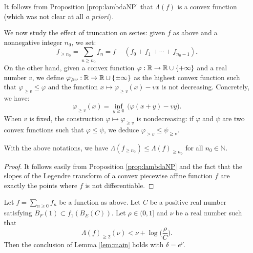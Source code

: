 \documentclass{lms}
\begin{document}
\begin{rem}
It follows from Proposition \ref{prop:lambdaNP} that $\Lambda(f)$ is a
convex function (which was not clear at all \emph{a priori}).
\end{rem}

We now study the effect of truncation on series: given $f$ as above
and a nonnegative integer $n_0$, we set:
$$f_{\geq n_0} = \sum_{n \geq n_0} f_n = f - (f_0 + f_1 + \cdots +
f_{n_0 - 1}).$$
On the other hand, given a convex function $\varphi : \mathbb R \to \mathbb R \cup
\{+\infty\}$ and a real number $v$, we define $\varphi_{\geqslant v} : \mathbb R \to 
\mathbb R \cup \{\pm \infty\}$ as the highest convex function such that 
$\varphi_{\geq v} \leq \varphi$ and the function $x \mapsto 
\varphi_{\geq v}(x) - v x$ is not decreasing. Concretely, we have:
$$\varphi_{\geq v}(x) = \inf_{y \geq 0} \, \big(\varphi(x + y) - v y 
\big).$$
When $v$ is fixed, the construction $\varphi \mapsto \varphi_{\geq v}$
is nondecreasing: if $\varphi$ and $\psi$ are two convex functions such
that $\varphi \leq \psi$, we deduce $\varphi_{\geq v} \leq \psi_{\geq v}$.

\begin{prop} \label{prop:trunc}
With the above notations, we have $\Lambda(f_{\geq n_0}) \leq
\Lambda(f)_{\geq n_0}$ for all $n_0 \in \mathbb N$.
\end{prop}

\begin{proof}
It follows easily from Proposition \ref{prop:lambdaNP} and the fact that 
the slopes of the Legendre transform of a convex piecewise affine 
function $f$ are exactly the points where $f$ is not differentiable.
\end{proof}

%

\begin{prop}
\label{prop:locanalytic}
Let $f = \sum_{n \geq 0} f_n$ be a function as above.
Let $C$ be a positive real number satisfying 
$B_F(1) \subset f_1(B_E(C))$.
Let $\rho \in (0, 1]$ and $\nu$ be a real number such that 
\begin{equation}
\label{eq:locanalytic}
\Lambda(f)_{\geq 2} (\nu) < \nu + \log \Big( \frac \rho C \Big).
\end{equation}
Then the conclusion of Lemma \ref{lem:main} holds with $\delta = e^\nu$.
\end{prop}
\end{document}
